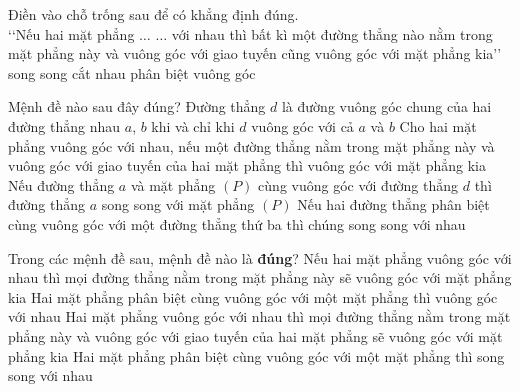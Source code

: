 \begin{ex}%
	Điền vào chỗ trống sau để có khẳng định đúng.\\ 
	\lq\lq Nếu hai mặt phẳng $\ldots$ $\ldots$ với nhau thì bất kì một  đường thẳng nào nằm trong mặt phẳng này và vuông góc với giao tuyến cũng vuông góc với mặt phẳng kia\rq\rq
	 \choice
		{song  song}
		{cắt nhau} 
		{phân biệt} 
		{\True vuông góc} 
\end{ex}

\begin{ex}%
	Mệnh đề nào  sau đây đúng?
	 \choice
		{Đường thẳng $d$ là đường vuông góc chung của hai đường thẳng nhau $a$, $b$ khi và chỉ khi $d$  vuông góc với cả $a$ và $b$}
		{\True Cho hai mặt phẳng vuông góc với nhau, nếu một đường thẳng nằm trong mặt phẳng này và vuông góc với giao  tuyến của hai mặt phẳng thì vuông góc với mặt phẳng kia}
		{Nếu đường thẳng $a$ và mặt phẳng $(P)$ cùng vuông góc với đường thẳng $d$ thì đường thẳng  $a$ song song với mặt phẳng $(P)$}
		{Nếu hai  đường thẳng phân biệt cùng vuông góc với một đường thẳng thứ ba thì chúng song song với nhau}
\end{ex}

\begin{ex}%
	Trong các mệnh đề sau,  mệnh đề nào là \textbf{đúng}?
	 \choice
		{Nếu hai mặt phẳng vuông góc với nhau thì mọi đường thẳng nằm trong  mặt phẳng này sẽ
		 vuông góc với mặt phẳng kia}
		{Hai mặt phẳng phân biệt cùng vuông  góc với một mặt phẳng thì vuông góc với nhau}
		{\True Hai mặt phẳng vuông góc với nhau thì mọi đường thẳng nằm trong mặt phẳng  này và vuông
		góc với giao tuyến của hai  mặt phẳng sẽ vuông góc với mặt phẳng kia}
		 {Hai mặt phẳng phân biệt cùng vuông góc với một mặt phẳng thì song song với nhau}
	 \loigiai{
	 }
\end{ex}



